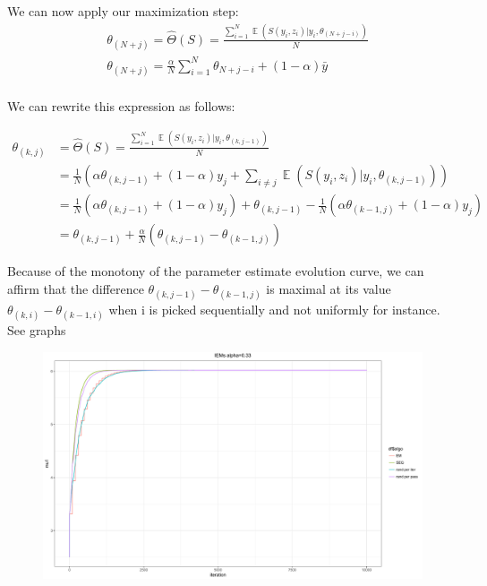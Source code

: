 \documentclass[a4paper]{article}
\theoremstyle{plain}
\DeclareMathOperator*{\E}{\mathbb{E}}
\theoremstyle{plain}
\theoremstyle{definition}
\begin{document}
\noindent We can now apply our maximization step:
\begin{equation}
\begin{split}
& \theta_{(N+j)} = \hat{\Theta}(S) = \frac{\sum_{i=1}^{N}{\E{(S(y_i,z_i)|y_i,\theta_{(N+j-i)})}}}{N}\\
& \theta_{(N+j)} = \frac{\alpha}{N} \sum_{i=1}^{N}{\theta_{N+j-i}} + (1-\alpha)\bar{y}\\
\end{split}
\end{equation}

We can rewrite this expression as follows:

\begin{equation}
\begin{split}
\theta_{(k,j)} &  = \hat{\Theta}(S) = \frac{\sum_{i=1}^{N}{\E{(S(y_i,z_i)|y_i,\theta_{(k,j-1)})}}}{N}\\
& = \frac{1}{N}(\alpha \theta_{(k,j-1)} + (1-\alpha)y_j + \sum_{i \neq j}^{}{\E{(S(y_i,z_i)|y_i,\theta_{(k,j-1)})}})\\
& = \frac{1}{N}(\alpha \theta_{(k,j-1)} + (1-\alpha)y_j) + \theta_{(k,j-1)} - \frac{1}{N}(\alpha \theta_{(k-1,j)} + (1-\alpha)y_j)\\
& =  \theta_{(k,j-1)} + \frac{\alpha}{N}(\theta_{(k,j-1)} - \theta_{(k-1,j)}) 
\end{split}
\end{equation}

Because of the monotony of the parameter estimate evolution curve, we can affirm that the difference $\theta_{(k,j-1)} - \theta_{(k-1,j)}$ is maximal at its value $\theta_{(k,i)} - \theta_{(k-1,i)}$ when i is picked sequentially and not uniformly for instance.\\

See graphs\\
\begin{figure}[H]
\begin{center}
\includegraphics[scale=0.3]{iem.pdf}
\end{center}
\end{figure}
\end{document}
